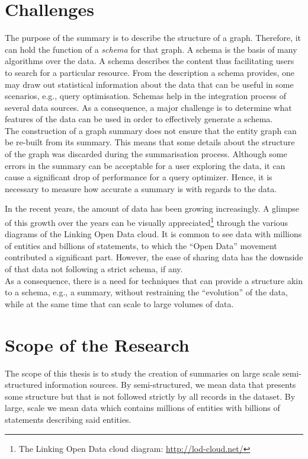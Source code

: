\section{Challenges}

The purpose of the summary is to describe the structure of a graph. Therefore, it can hold the function of a \emph{schema} for that graph.
A schema is the basis of many algorithms over the data. A schema describes the content thus facilitating users to search for a particular resource. From the description a schema provides, one may draw out statistical information about the data that can be useful in some scenarios, e.g., query optimisation. Schemas help in the integration process of several data sources. As a consequence, a major challenge is to determine what features of the data can be used in order to effectively generate a schema.\\

The construction of a graph summary does not ensure that the entity graph can be re-built from its summary. This means that some details about the structure of the graph was discarded during the summarisation process. Although some errors in the summary can be acceptable for a user exploring the data, it can cause a significant drop of performance for a query optimizer. Hence, it is necessary to measure how accurate a summary is with regards to the data.

In the recent years, the amount of data has been growing increasingly. A glimpse of this growth over the years can be visually appreciated\footnote{The Linking Open Data cloud diagram: \url{http://lod-cloud.net/}} through the various diagrams of the Linking Open Data cloud. It is common to see data with millions of entities and billions of statements, to which the ``Open Data'' movement contributed a significant part. However, the ease of sharing data has the downside of that data not following a strict schema, if any.\\

As a consequence, there is a need for techniques that can provide a structure akin to a schema, e.g., a summary, without restraining the ``evolution'' of the data, while at the same time that can scale to large volumes of data.

\section{Scope of the Research}

The scope of this thesis is to study the creation of summaries on large scale semi-structured information sources. By semi-structured, we mean data that presents some structure but that is not followed strictly by all records in the dataset. By large, scale we mean data which contains millions of entities with billions of statements describing said entities.

